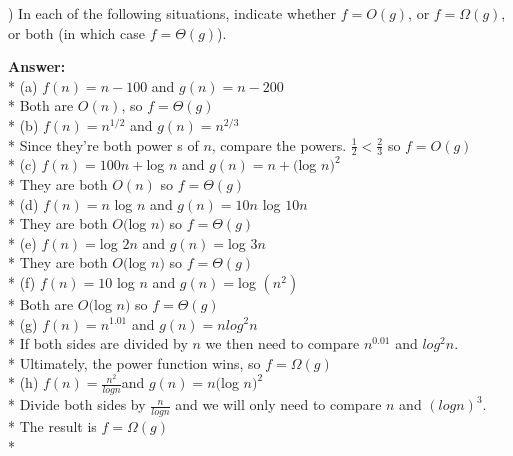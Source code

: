 \documentclass{article}
\begin{document}

\vspace{.2in}


\vspace{.2in}
) In each of the following situations, indicate whether $f  = O(g)$, or $f = \Omega(g)$, 
\indent or both (in which case $f = \Theta(g)$).

\vspace{.1in}
{\bf Answer:} \\*
\indent (a) $f(n) = n - 100$ and $g(n) = n - 200$ \\*
\indent \indent Both are $O(n)$, so $f = \Theta(g)$ \\*
\indent (b) $f(n) = n^{1/2}$ and $g(n) = n^{2/3}$\\*
\indent \indent Since they're both power s of $n$, compare the powers. $\frac{1}{2} < \frac{2}{3}$ so $f = O(g)$ \\*
\indent (c) $f(n) = 100n + $log $n$ and $g(n) = n + ($log $n)^2$\\*
\indent \indent They are both $O(n)$ so $f = \Theta(g)$ \\*
\indent (d) $f(n)  = n$ log $n$ and $g(n) = 10n$ log $10n$\\*
\indent \indent They are both $O($log $n)$ so $f = \Theta(g)$ \\*
\indent (e) $f(n) = $log $2n$ and $g(n) = $log $3n$\\*
\indent \indent They are both $O($log $n)$ so $f = \Theta(g)$ \\*
\indent (f) $f(n) = 10$ log $n$ and $g(n) = $log $(n^2)$ \\*
\indent \indent Both are $O($log $n)$ so $f = \Theta(g)$ \\*
\indent (g) $f(n) = n^{1.01}$ and $g(n) = n log^2n$\\*
\indent \indent If both sides are divided by $n$ we then need to compare $n^{0.01}$ and $log^2n$. \\*
\indent \indent Ultimately, the power function wins, so $f = \Omega(g)$\\*
\indent (h) $f(n) = \frac{n^2}{logn}$and $g(n) = n($log $n)^2$\\*
\indent \indent Divide both sides by $\frac{n}{logn}$ and we will only need to compare $n$ and $(logn)^3$. \\*
\indent \indent The result is $f = \Omega(g)$\\*
\end{document}
